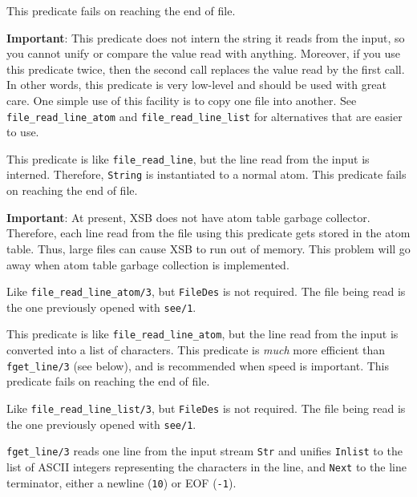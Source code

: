 \begin{description}
    This predicate fails on reaching the end of file.
    
    {\bf Important}: This predicate does not intern the string it reads
    from the input, so you cannot unify or compare the value read with
    anything. Moreover, if you use this predicate twice, then the second
    call replaces the value read by the first call. In other words, this
    predicate is very low-level and should be used with great care.
    One simple use of this facility is to copy one file into another.
    See \verb|file_read_line_atom| and \verb|file_read_line_list| for
    alternatives that are easier to use.

    This predicate is like \verb|file_read_line|, but the line read from
    the input is interned. Therefore, {\tt String} is instantiated
    to a normal atom. This predicate fails on reaching the end of file.
    
    {\bf Important}: At present, XSB does not have atom table garbage
    collector. Therefore, each line read from the file using this predicate
    gets stored in the atom table. Thus, large files can cause XSB to run
    out of memory.  This problem will go away when atom table garbage
    collection is implemented.

   Like \verb|file_read_line_atom/3|, but {\tt FileDes} is not required.
   The file being read is the one previously opened with {\tt see/1}.

    This predicate is like \verb|file_read_line_atom|, but the line read from
    the input is converted into a list of characters.
    This predicate is \emph{much} more efficient than {{\tt fget\_line/3}}
    (see below), and is recommended when speed is important.
    This predicate fails on reaching the end of file.

   Like \verb|file_read_line_list/3|, but {\tt FileDes} is not required.
   The file being read is the one previously opened with {\tt see/1}.

    {\tt fget\_line/3} reads one line from the input stream {\tt Str} and
    unifies {\tt Inlist} to the list of ASCII integers representing the
    characters in the line, and {\tt Next} to the line terminator, either
    a newline ({\tt 10}) or EOF ({\tt-1}).
    

\end{description}
